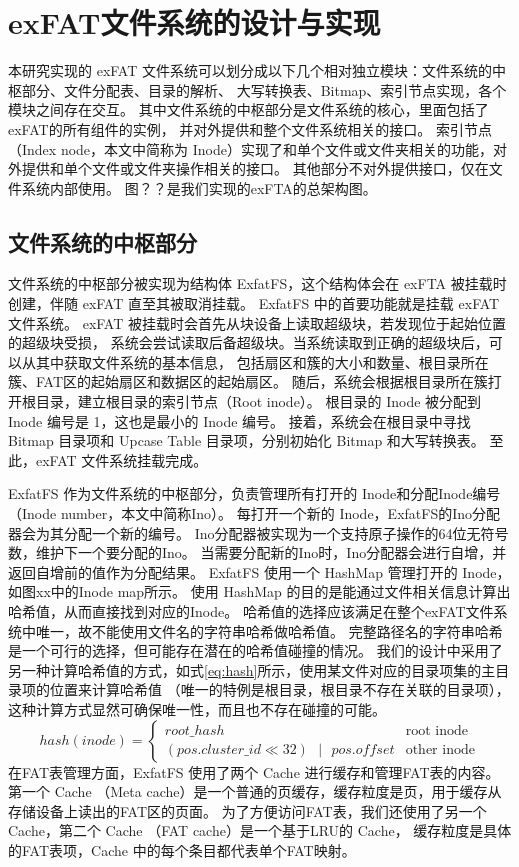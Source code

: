 
\chapter{exFAT文件系统的设计与实现}
本研究实现的 exFAT 文件系统可以划分成以下几个相对独立模块：文件系统的中枢部分、文件分配表、目录的解析、
大写转换表、Bitmap、索引节点实现，各个模块之间存在交互。
其中文件系统的中枢部分是文件系统的核心，里面包括了exFAT的所有组件的实例，
并对外提供和整个文件系统相关的接口。
索引节点（Index node，本文中简称为 Inode）实现了和单个文件或文件夹相关的功能，对外提供和单个文件或文件夹操作相关的接口。
其他部分不对外提供接口，仅在文件系统内部使用。
图？？是我们实现的exFTA的总架构图。

\section{文件系统的中枢部分}
文件系统的中枢部分被实现为结构体 ExfatFS，这个结构体会在 exFTA 被挂载时创建，伴随 exFAT 直至其被取消挂载。
ExfatFS 中的首要功能就是挂载 exFAT 文件系统。
exFAT 被挂载时会首先从块设备上读取超级块，若发现位于起始位置的超级块受损，
系统会尝试读取后备超级块。当系统读取到正确的超级块后，可以从其中获取文件系统的基本信息，
包括扇区和簇的大小和数量、根目录所在簇、FAT区的起始扇区和数据区的起始扇区。
随后，系统会根据根目录所在簇打开根目录，建立根目录的索引节点（Root inode）。
根目录的 Inode 被分配到 Inode 编号是 1，这也是最小的 Inode 编号。
接着，系统会在根目录中寻找 Bitmap 目录项和 Upcase Table 目录项，分别初始化 Bitmap 和大写转换表。
至此，exFAT 文件系统挂载完成。

ExfatFS 作为文件系统的中枢部分，负责管理所有打开的 Inode和分配Inode编号（Inode number，本文中简称Ino）。
每打开一个新的 Inode，ExfatFS的Ino分配器会为其分配一个新的编号。
Ino分配器被实现为一个支持原子操作的64位无符号数，维护下一个要分配的Ino。
当需要分配新的Ino时，Ino分配器会进行自增，并返回自增前的值作为分配结果。
ExfatFS 使用一个 HashMap 管理打开的 Inode，如图xx中的Inode map所示。
使用 HashMap 的目的是能通过文件相关信息计算出哈希值，从而直接找到对应的Inode。
哈希值的选择应该满足在整个exFAT文件系统中唯一，故不能使用文件名的字符串哈希做哈希值。
完整路径名的字符串哈希是一个可行的选择，但可能存在潜在的哈希值碰撞的情况。
我们的设计中采用了另一种计算哈希值的方式，如式\ref{eq:hash}所示，使用某文件对应的目录项集的主目录项的位置来计算哈希值
（唯一的特例是根目录，根目录不存在关联的目录项），这种计算方式显然可确保唯一性，而且也不存在碰撞的可能。
\begin{equation}\label{eq:hash}
    hash(inode) = 
    \begin{cases}
        root\_hash & \text{root inode} \\
        (pos.cluster\_id \ll 32) \text{ }|\text{ } pos.offset & \text{other inode}
    \end{cases}
\end{equation}
在FAT表管理方面，ExfatFS 使用了两个 Cache 进行缓存和管理FAT表的内容。
第一个 Cache （Meta cache）是一个普通的页缓存，缓存粒度是页，用于缓存从存储设备上读出的FAT区的页面。
为了方便访问FAT表，我们还使用了另一个 Cache，第二个 Cache （FAT cache）是一个基于LRU的 Cache，
缓存粒度是具体的FAT表项，Cache 中的每个条目都代表单个FAT映射。

